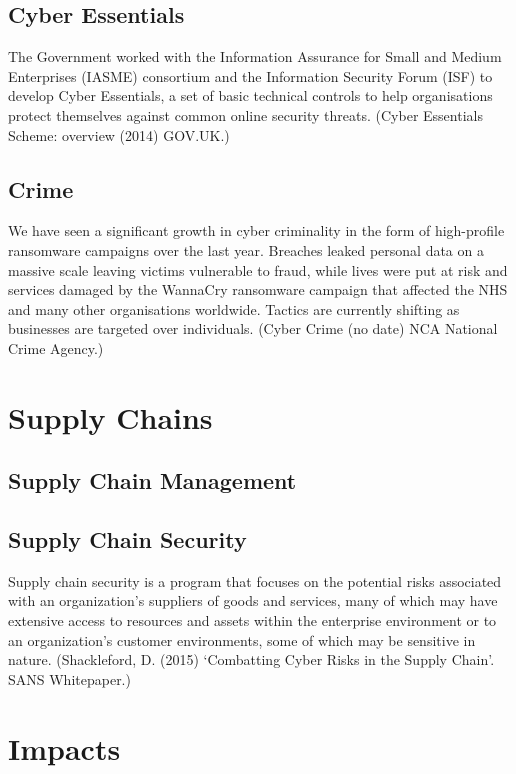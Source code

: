     \subsection{Cyber Essentials}
        The Government worked with the Information Assurance for Small and Medium Enterprises (IASME) consortium and the Information Security Forum (ISF) to develop Cyber Essentials, a set of basic technical controls to help organisations protect themselves against common online security threats. (Cyber Essentials Scheme: overview (2014) GOV.UK.)

    \subsection{Crime}
        We have seen a significant growth in cyber criminality in the form of high-profile ransomware campaigns over the last year. Breaches leaked personal data on a massive scale leaving victims vulnerable to fraud, while lives were put at risk and services damaged by the WannaCry ransomware campaign that affected the NHS and many other organisations worldwide. Tactics are currently shifting as businesses are targeted over individuals. (Cyber Crime (no date) NCA National Crime Agency.)

\section{Supply Chains}

    \subsection{Supply Chain Management}

    \subsection{Supply Chain Security}
        Supply chain security is a program that focuses on the potential risks associated with an organization’s suppliers of goods and services, many of which may have extensive access to resources and assets within the enterprise environment or to an organization’s customer environments, some of which may be sensitive in nature. (Shackleford, D. (2015) ‘Combatting Cyber Risks in the Supply Chain’. SANS Whitepaper.)

\section{Impacts}

